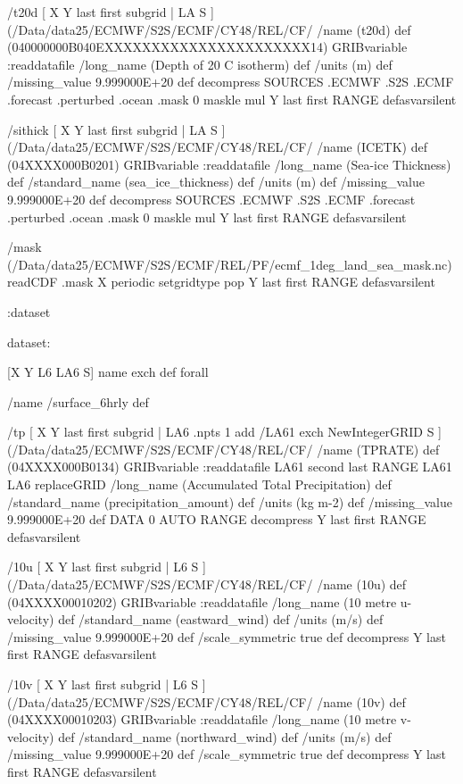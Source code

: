 \begin{ingrid}
/t20d { [ X Y last first subgrid | LA S ] (/Data/data25/ECMWF/S2S/ECMF/CY48/REL/CF/%
/name (t20d) def
 (040000000B040EXXXXXXXXXXXXXXXXXXXXXX14) GRIBvariable
:readdatafile
/long_name (Depth of 20 C isotherm) def
/units (m) def
/missing_value 9.999000E+20 def
decompress
  SOURCES .ECMWF .S2S .ECMF .forecast .perturbed .ocean .mask
   0 maskle
   mul
Y last first RANGE
} defasvarsilent

/sithick { [ X Y last first subgrid | LA S ] (/Data/data25/ECMWF/S2S/ECMF/CY48/REL/CF/%
/name (ICETK) def
(04XXXX000B0201) GRIBvariable
:readdatafile
/long_name (Sea-ice Thickness) def
/standard_name (sea_ice_thickness) def
/units (m) def
/missing_value 9.999000E+20 def
decompress
  SOURCES .ECMWF .S2S .ECMF .forecast .perturbed .ocean .mask
   0 maskle
   mul
Y last first RANGE
} defasvarsilent


/mask { (/Data/data25/ECMWF/S2S/ECMF/REL/PF/ecmf_1deg_land_sea_mask.nc) readCDF .mask
X periodic setgridtype pop
Y last first RANGE
} defasvarsilent

:dataset



dataset:

[X Y L6 LA6 S] {name exch def } forall

/name /surface_6hrly def

/tp { [ X Y last first subgrid | LA6 .npts 1 add /LA61 exch NewIntegerGRID S ] (/Data/data25/ECMWF/S2S/ECMF/CY48/REL/CF/%
/name (TPRATE) def
(04XXXX000B0134) GRIBvariable
:readdatafile
LA61 second last RANGE
LA61 LA6 replaceGRID 
/long_name (Accumulated Total Precipitation) def
/standard_name (precipitation_amount) def
/units (kg m-2) def
/missing_value 9.999000E+20 def
DATA 0 AUTO RANGE
decompress
Y last first RANGE
} defasvarsilent

/10u { [ X Y last first subgrid | L6 S ] (/Data/data25/ECMWF/S2S/ECMF/CY48/REL/CF/%
/name (10u) def
(04XXXX00010202) GRIBvariable
:readdatafile
/long_name (10 metre u-velocity) def
/standard_name (eastward_wind) def
/units (m/s) def
/missing_value 9.999000E+20 def
/scale_symmetric true def
decompress
Y last first RANGE
} defasvarsilent

/10v { [ X Y last first subgrid | L6 S ] (/Data/data25/ECMWF/S2S/ECMF/CY48/REL/CF/%
/name (10v) def
(04XXXX00010203) GRIBvariable
:readdatafile
/long_name (10 metre v-velocity) def
/standard_name (northward_wind) def
/units (m/s) def
/missing_value 9.999000E+20 def
/scale_symmetric true def
decompress
Y last first RANGE
} defasvarsilent


\end{ingrid}
